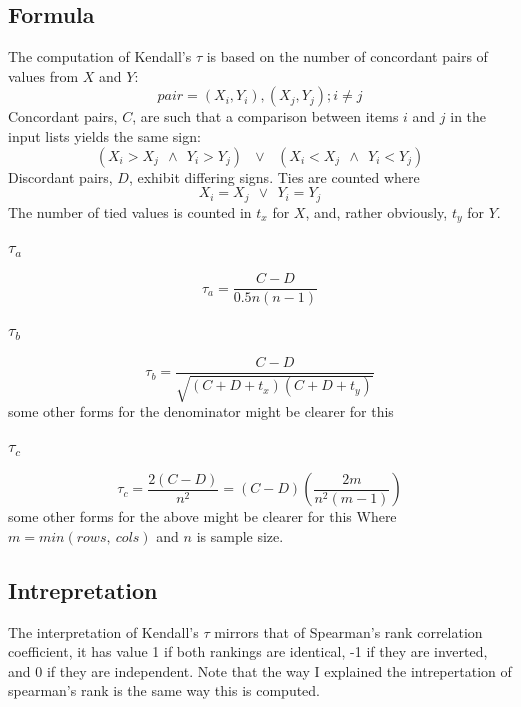 \documentclass[11pt]{article}
\begin{document}
\subsection{Formula}
\label{section:kendalltau:formula}
The computation of Kendall's $\tau$ is based on the number of concordant pairs of values from $X$ and $Y$:
$$
pair = (X_i, Y_i), (X_j, Y_j); i \neq j
$$
Concordant pairs, $C$, are such that a comparison between items $i$ and $j$ in the input lists yields the same sign:
$$
(X_i > X_j ~~\wedge~~ Y_i > Y_j)
~~~ \vee ~~~
(X_i < X_j ~~\wedge~~ Y_i < Y_j)
$$
Discordant pairs, $D$, exhibit differing signs.  Ties are counted where
$$
X_i = X_j ~~\vee~~ Y_i = Y_j
$$
The number of tied values is counted in $t_x$ for $X$, and, rather obviously, $t_y$ for $Y$.

\subsubsection{$\tau_a$}
$$
\tau_a = \frac{C-D}{0.5 n (n-1)}
$$

\subsubsection{$\tau_b$}
$$
\tau_b = \frac{C-D}{ \sqrt{(C + D + t_x)(C + D + t_y)}  }
$$
{\color{red} some other forms for the denominator might be clearer for this}

\subsubsection{$\tau_c$}
$$
\tau_c = \frac{2(C-D)}{n^2} = (C-D) \left( \frac{ 2m }{n^2(m-1)} \right)
$$
{\color{red} some other forms for the above might be clearer for this}
Where $m = min(rows,~cols)$ and $n$ is sample size.


\subsection{Intrepretation}
The interpretation of Kendall's $\tau$ mirrors that of Spearman's rank correlation coefficient, it has value 1 if both rankings are identical, -1 if they are inverted, and 0 if they are independent.  Note that the way I explained the intrepertation of spearman's rank is the same way this is computed.
\end{document}
